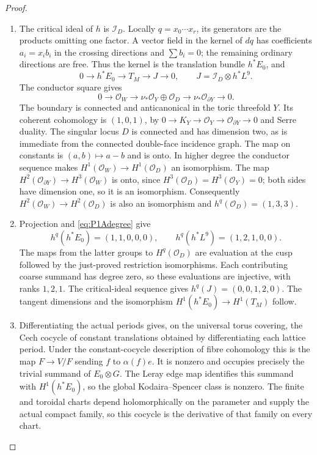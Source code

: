 \begin{proof}
\begin{enumerate}[label=\arabic*.]
\item The critical ideal of $h$ is $\mathcal I_D$. Locally
$q=x_0\cdots x_r$, its generators are the products omitting
one factor. A vector field in the kernel of $dq$ has coefficients
$a_i=x_i b_i$ in the crossing directions and
$\sum b_i=0$; the remaining ordinary directions are free.
Thus the kernel is the translation bundle $h^*E_0$, and
\[
0\to h^*E_0\to T_M\to J\to0,
\qquad J=\mathcal I_D\otimes h^*L^9.
\]
The conductor square gives
\[
0\to\mathcal O_W\to\nu_*\mathcal O_Y\oplus\mathcal O_D
 \to\nu_*\mathcal O_{\partial Y}\to0.
\]
The boundary is connected and anticanonical in the toric
threefold $Y$. Its coherent cohomology is $(1,0,1)$, by
$0\to K_Y\to\mathcal O_Y\to\mathcal O_{\partial Y}\to0$
and Serre duality. The singular locus $D$ is connected and
has dimension two, as is immediate from the connected
double-face incidence graph. The map on constants is
$(a,b)\mapsto a-b$ and is onto. In higher degree the conductor
sequence makes $H^1(\mathcal O_W)\to H^1(\mathcal O_D)$
an isomorphism. The map
$H^2(\mathcal O_{\partial Y})\to H^3(\mathcal O_W)$ is onto,
since $H^3(\mathcal O_D)=H^3(\mathcal O_Y)=0$; both sides
have dimension one, so it is an isomorphism. Consequently
$H^2(\mathcal O_W)\to H^2(\mathcal O_D)$ is also an
isomorphism and $h^q(\mathcal O_D)=(1,3,3)$.

\item Projection and \eqref{eq:P1Adegree} give
\[
h^q(h^*E_0)=(1,1,0,0,0),\qquad
h^q(h^*L^9)=(1,2,1,0,0).
\]
The maps from the latter groups to $H^q(\mathcal O_D)$
are evaluation at the cusp followed by the just-proved
restriction isomorphisms. Each contributing coarse summand
has degree zero, so these evaluations are injective, with
ranks $1,2,1$. The critical-ideal sequence gives
$h^q(J)=(0,0,1,2,0)$. The tangent dimensions and the
isomorphism $H^1(h^*E_0)\to H^1(T_M)$ follow.

\item Differentiating the actual periods gives, on the universal
torus covering, the Cech cocycle of constant translations
obtained by differentiating each lattice period. Under the
constant-cocycle description of fibre cohomology this is
the map $F\to V/F$ sending $f$ to $\alpha(f)e$.
It is nonzero and occupies precisely the trivial summand
of $E_0\otimes G$. The Leray edge map identifies this summand
with $H^1(h^*E_0)$, so the global Kodaira--Spencer class is
nonzero. The finite and toroidal charts depend holomorphically
on the parameter and supply the actual compact family,
so this cocycle is the derivative of that family on every chart.


\end{enumerate}
\end{proof}
